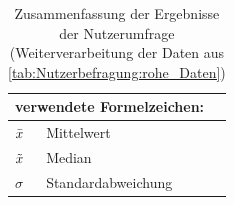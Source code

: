 \begin{table}[H]
\begin{tabular}{ll}
\multicolumn{2}{l}{verwendete Formelzeichen:} \\ \hline
$\Bar{x}$          & Mittelwert               \\
$\Tilde{x}$        & Median                   \\
$\sigma$           & Standardabweichung      
\end{tabular}
\caption{Zusammenfassung der Ergebnisse der Nutzerumfrage (Weiterverarbeitung der Daten aus \autoref{tab:Nutzerbefragung:rohe_Daten})}
\label{tab:Nutzerbefragung:mittelwerte}
\end{table}